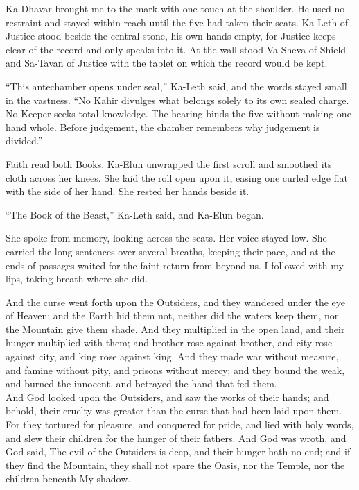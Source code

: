 Ka-Dhavar brought me to the mark with one touch at the shoulder. He used no restraint and stayed within reach until the five had taken their seats. Ka-Leth of Justice stood beside the central stone, his own hands empty, for Justice keeps clear of the record and only speaks into it. At the wall stood Va-Sheva of Shield and Sa-Tavan of Justice with the tablet on which the record would be kept.\par

``This antechamber opens under seal,'' Ka-Leth said, and the words stayed small in the vastness. ``No Kahir divulges what belongs solely to its own sealed charge. No Keeper seeks total knowledge. The hearing binds the five without making one hand whole. Before judgement, the chamber remembers why judgement is divided.''\par

Faith read both Books. Ka-Elun unwrapped the first scroll and smoothed its cloth across her knees. She laid the roll open upon it, easing one curled edge flat with the side of her hand. She rested her hands beside it.\par

``The Book of the Beast,'' Ka-Leth said, and Ka-Elun began.\par

She spoke from memory, looking across the seats. Her voice stayed low. She carried the long sentences over several breaths, keeping their pace, and at the ends of passages waited for the faint return from beyond us. I followed with my lips, taking breath where she did.\par

\begin{scripture}
And the curse went forth upon the Outsiders, and they wandered under the eye of Heaven; and the Earth hid them not, neither did the waters keep them, nor the Mountain give them shade. And they multiplied in the open land, and their hunger multiplied with them; and brother rose against brother, and city rose against city, and king rose against king. And they made war without measure, and famine without pity, and prisons without mercy; and they bound the weak, and burned the innocent, and betrayed the hand that fed them.\\
And God looked upon the Outsiders, and saw the works of their hands; and behold, their cruelty was greater than the curse that had been laid upon them. For they tortured for pleasure, and conquered for pride, and lied with holy words, and slew their children for the hunger of their fathers. And God was wroth, and God said, The evil of the Outsiders is deep, and their hunger hath no end; and if they find the Mountain, they shall not spare the Oasis, nor the Temple, nor the children beneath My shadow.
\end{scripture}

